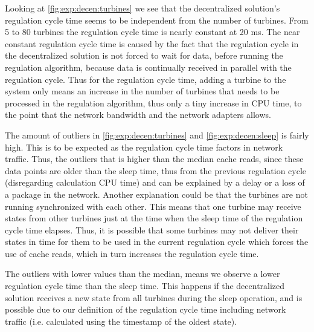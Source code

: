 Looking at \cref{fig:exp:decen:turbines} we see that the decentralized solution's regulation cycle time seems to be independent from the number of turbines. From 5 to 80 turbines the regulation cycle time is nearly constant at 20 ms.
The near constant regulation cycle time is caused by the fact that the regulation cycle in the decentralized solution is not forced to wait for data, before running the regulation algorithm, because data is continually received in parallel with the regulation cycle. Thus for the regulation cycle time, adding a turbine to the system only means an increase in the number of turbines that needs to be processed in the regulation algorithm, thus only a tiny increase in CPU time, to the point that the network bandwidth and the network adapters allows.

The amount of outliers in \cref{fig:exp:decen:turbines} and \cref{fig:exp:decen:sleep} is fairly high. This is to be expected as the regulation cycle time factors in network traffic. Thus, the outliers that is higher than the median cache reads, since these data points are older than the sleep time, thus from the previous regulation cycle (disregarding calculation CPU time) and can be explained by a delay or a loss of a package in the network. Another explanation could be that the turbines are not running synchronized with each other. This means that one turbine may receive states from other turbines just at the time when the sleep time of the regulation cycle time elapses. Thus, it is possible that some turbines may not deliver their states in time for them to be used in the current regulation cycle which forces the use of cache reads, which in turn increases the regulation cycle time.

The outliers with lower values than the median, means we observe a lower regulation cycle time than the sleep time. This happens if the decentralized solution receives a new state from all turbines during the sleep operation, and is possible due to our definition of the regulation cycle time including network traffic (i.e. calculated using the timestamp of the oldest state).
 
\clearpage